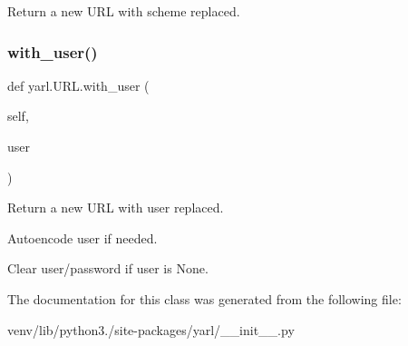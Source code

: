\begin{DoxyVerb}Return a new URL with scheme replaced.\end{DoxyVerb}
 \mbox{\label{classyarl_1_1_u_r_l_a8d76855aa317e45d41073eff8f992394}} 
\subsubsection{\texorpdfstring{with\+\_\+user()}{with\_user()}}
{\footnotesize\ttfamily def yarl.\+U\+R\+L.\+with\+\_\+user (\begin{DoxyParamCaption}\item[{}]{self,  }\item[{}]{user }\end{DoxyParamCaption})}

\begin{DoxyVerb}Return a new URL with user replaced.

Autoencode user if needed.

Clear user/password if user is None.\end{DoxyVerb}
 

The documentation for this class was generated from the following file\+:\begin{DoxyCompactItemize}
\item 
venv/lib/python3./site-\/packages/yarl/\+\_\+\+\_\+init\+\_\+\+\_\+.\+py\end{DoxyCompactItemize}
